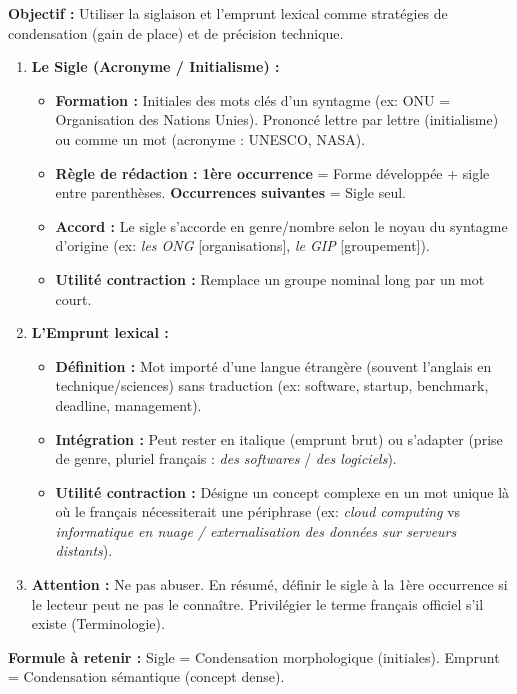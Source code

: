\documentclass[11pt]{article}
\newcommand{\cle}[1]{{\popxbold\color{popdark}#1}}
\begin{document}
\begin{methode}
    \textbf{Objectif :} Utiliser la siglaison et l'emprunt lexical comme stratégies de \cle{condensation} (gain de place) et de \cle{précision} technique.
    \begin{enumerate}
        \item \textbf{Le Sigle (Acronyme / Initialisme) :}
            \begin{itemize}
                \item \textbf{Formation :} Initiales des mots clés d'un syntagme (ex: \cle{ONU} = Organisation des Nations Unies). Prononcé lettre par lettre (initialisme) ou comme un mot (acronyme : \cle{UNESCO}, \cle{NASA}).
                \item \textbf{Règle de rédaction :} \textbf{1ère occurrence} = Forme développée + sigle entre parenthèses. \textbf{Occurrences suivantes} = Sigle seul.
                \item \textbf{Accord :} Le sigle s'accorde en genre/nombre selon le noyau du syntagme d'origine (ex: \emph{les ONG} [organisations], \emph{le GIP} [groupement]).
                \item \textbf{Utilité contraction :} Remplace un groupe nominal long par un mot court.
            \end{itemize}
        \item \textbf{L'Emprunt lexical :}
            \begin{itemize}
                \item \textbf{Définition :} Mot importé d'une langue étrangère (souvent l'anglais en technique/sciences) sans traduction (ex: \cle{software}, \cle{startup}, \cle{benchmark}, \cle{deadline}, \cle{management}).
                \item \textbf{Intégration :} Peut rester en italique (emprunt brut) ou s'adapter (prise de genre, pluriel français : \emph{des softwares} / \emph{des logiciels}).
                \item \textbf{Utilité contraction :} Désigne un concept complexe en un mot unique là où le français nécessiterait une périphrase (ex: \emph{cloud computing} vs \emph{informatique en nuage / externalisation des données sur serveurs distants}).
            \end{itemize}
        \item \textbf{Attention :} Ne pas abuser. En résumé, définir le sigle à la 1ère occurrence si le lecteur peut ne pas le connaître. Privilégier le terme français officiel s'il existe (Terminologie).
    \end{enumerate}
    \textbf{Formule à retenir :} \cle{Sigle} = Condensation morphologique (initiales). \cle{Emprunt} = Condensation sémantique (concept dense).
\end{methode}
\end{document}
